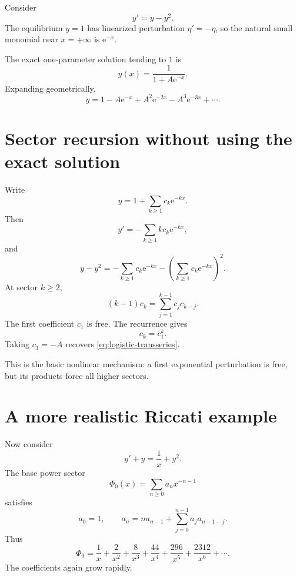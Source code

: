 \documentclass[11pt,oneside]{book}
\theoremstyle{definition}
\theoremstyle{remark}
\newcommand{\e}{\mathrm{e}}
\begin{document}
Consider
\begin{equation}
  y'=y-y^2.
  \label{eq:logistic}
\end{equation}
The equilibrium $y=1$ has linearized perturbation $\eta'=-\eta$, so the natural
small monomial near $x=+\infty$ is $\e^{-x}$.

The exact one-parameter solution tending to $1$ is
\begin{equation}
  y(x)=\frac1{1+A\e^{-x}}.
  \label{eq:logistic-exact}
\end{equation}
Expanding geometrically,
\begin{equation}
  y=1-A\e^{-x}+A^2\e^{-2x}
    -A^3\e^{-3x}+\cdots.
  \label{eq:logistic-transseries}
\end{equation}

\section{Sector recursion without using the exact solution}

Write
\[
  y=1+\sum_{k\ge1}c_k\e^{-kx}.
\]
Then
\[
  y'=-\sum_{k\ge1}k c_k\e^{-kx},
\]
and
\[
  y-y^2=-\sum_{k\ge1}c_k\e^{-kx}
  -\left(\sum_{k\ge1}c_k\e^{-kx}\right)^2.
\]
At sector $k\ge2$,
\begin{equation}
  (k-1)c_k=\sum_{j=1}^{k-1}c_jc_{k-j}.
  \label{eq:logistic-sector-recurrence}
\end{equation}
The first coefficient $c_1$ is free. The recurrence gives
\[
  c_k=c_1^k.
\]
Taking $c_1=-A$ recovers \eqref{eq:logistic-transseries}.

This is the basic nonlinear mechanism: a first exponential perturbation is free,
but its products force all higher sectors.

\section{A more realistic Riccati example}

Now consider
\begin{equation}
  y'+y=\frac1x+y^2.
  \label{eq:riccati-transseries}
\end{equation}
The base power sector
\[
  \Phi_0(x)=\sum_{n\ge0}a_nx^{-n-1}
\]
satisfies
\begin{equation}
  a_0=1,
  \qquad
  a_n=na_{n-1}+\sum_{j=0}^{n-1}a_ja_{n-1-j}.
  \label{eq:riccati-a-recurrence}
\end{equation}
Thus
\[
  \Phi_0=\frac1x+\frac2{x^2}+\frac8{x^3}
  +\frac{44}{x^4}+\frac{296}{x^5}
  +\frac{2312}{x^6}+\cdots.
\]
The coefficients again grow rapidly.
\end{document}
